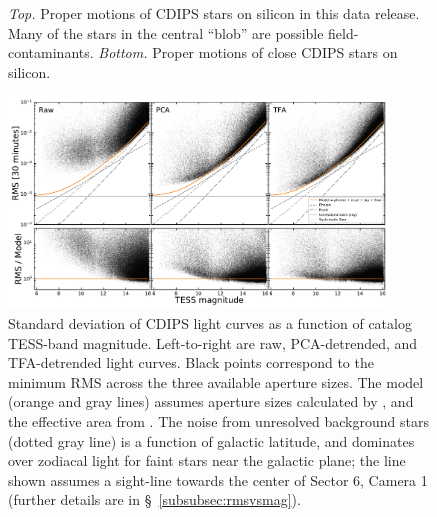 \documentclass[12pt,twocolumn,tighten]{aastex62}
\begin{document}
\begin{figure}[!t]
	\vspace{-0.9cm}
	\vspace{-0.9cm}
	\caption{
		{\it Top.} Proper motions of CDIPS stars on silicon in this
		data release.  Many of the stars in the central ``blob'' are possible
		field-contaminants.
		{\it Bottom.} Proper motions of close CDIPS stars
		on silicon.
	}
	\label{fig:propermotions}
\end{figure}

\begin{figure}[!t]
	\begin{center}
		\leavevmode
		\includegraphics[width=0.9\textwidth]{IRM-PCA-TFA_rms_vs_mag.pdf}
	\end{center}
	\vspace{-0.7cm}
	\caption{
    Standard deviation of CDIPS light curves as a function of catalog
    TESS-band magnitude.  Left-to-right are raw, PCA-detrended, and
    TFA-detrended light curves. Black points correspond to the minimum
    RMS across the three available aperture sizes.  The model (orange
    and gray lines) assumes aperture sizes calculated by
    \citet{Sullivan_et_al_2015}, and the effective area from
    \citet{vanderspek_2018}.  The noise from unresolved background
    stars (dotted gray line) is a function of galactic latitude, and
    dominates over zodiacal light for faint stars near the galactic
    plane; the line shown assumes a sight-line towards the center of
    Sector 6, Camera 1 (further details are in
    \S~\ref{subsubsec:rmsvsmag}).
		\label{fig:rms_vs_mag}
	}
\end{figure}
\end{document}
